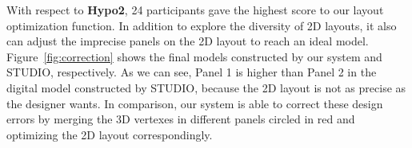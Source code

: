 \begin{figure}
	\centering
	\vspace{-1ex}
	\vspace{-1ex}
	\caption{ }
	\label{fig:userstudy}
\end{figure}

With respect to \textbf{Hypo2}, 24 participants gave the highest score to our layout optimization function. 
%
In addition to explore the diversity of 2D layouts, it also can adjust the imprecise panels on the 2D layout to reach an ideal model. Figure~\ref{fig:correction} shows the final models constructed by our system and STUDIO, respectively. As we can see, Panel 1 is higher than Panel 2 in the digital model constructed by STUDIO, because the 2D layout is not as precise as the designer wants. 
%
In comparison, our system is able to correct these design errors by merging the 3D vertexes in different panels circled in red and optimizing the 2D layout correspondingly.

